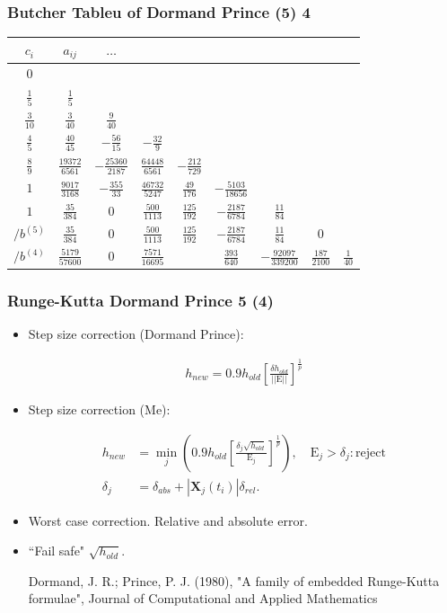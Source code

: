 \documentclass{beamer}
\begin{document}
\begin{frame}
\frametitle{Butcher Tableu of Dormand Prince (5) 4}
\begin{tabular}{c | @{\quad} c @{\quad} c @{\quad} c @{\quad} c @{\quad} c @{\quad} c @{\quad} c @{\quad} c}
$c_i$ & $a_{ij}$ & $\hdots$\\
\midrule
$0$ \\
$\frac{1}{5}$ & $\frac{1}{5}$\\
$\frac{3}{10}$ & $\frac{3}{40}$ &  $\frac{9}{40}$\\
$\frac{4}{5}$ & $\frac{40}{45}$ &  $-\frac{56}{15}$  &  $-\frac{32}{9}$\\
$\frac{8}{9}$ & $\frac{19372}{6561}$ & $-\frac{25360}{2187}$ & $\frac{64448}{6561}$ & $-\frac{212}{729}$\\
$1$ & $\frac{9017}{3168}$ & $-\frac{355}{33}$ & $\frac{46732}{5247}$ & $\frac{49}{176}$  & $-\frac{5103}{18656}$\\
$1$ & $\frac{35}{384}$  & $0$	 & $\frac{500}{1113}$ & $\frac{125}{192}$ & $-\frac{2187}{6784}$ & $\frac{11}{84}$\\
\midrule
$/b^{(5)}$  & $\frac{35}{384}$ & $0$ & $\frac{500}{1113}$ & $\frac{125}{192}$ & $-\frac{2187}{6784}$ & $\frac{11}{84}$ & $0$\\
$/b^{(4)}$ & $\frac{5179}{57600}$ & $0$ & $\frac{7571}{16695}$ & & $\frac{393}{640}$ & $-\frac{92097}{339200}$& $\frac{187}{2100}$ & $\frac{1}{40}$
\end{tabular}
\end{frame}

\begin{frame}
\frametitle{Runge-Kutta Dormand Prince 5 (4)}

\begin{itemize}
\item <1-> Step size correction (Dormand Prince):

\begin{align*}
h_{new} = 0.9 h_{old} \left[\frac{\delta h_{old}}{||\mathrm{E}||}\right]^{\frac{1}{p}}
\end{align*}

\item <2-> Step size correction (Me):

\begin{align*}
h_{new} &= \min_j \left(0.9 h_{old} \left[\frac{\delta_j\sqrt{h_{old}}}{\mathrm{E}_{j}}\right]^{\frac{1}{p}}\right), \quad \mathrm{E}_j>\delta_j : \mathrm{reject}\\
\delta_j &=\delta_{abs}+|\mathbf{X}_j(t_{i})|\delta_{rel}.
\end{align*}

\item <3-> Worst case correction. Relative and absolute error.

\item<4-> ``Fail safe" $\sqrt{h_{old}}$.

{\color{gray} Dormand, J. R.; Prince, P. J. (1980), "A family of embedded Runge-Kutta formulae", Journal of Computational and Applied Mathematics}
\end{itemize}
\end{frame}
\end{document}
